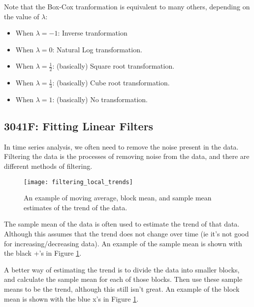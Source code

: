         Note that the Box-Cox tranformation is equivalent to many others, depending on the value of $\lambda$:
        \begin{itemize}
            \item When $\lambda = -1$: Inverse tranformation
            \item When $\lambda = 0$: Natural Log transformation.
            \item When $\lambda = \frac{1}{2}$: (basically) Square root transformation.
            \item When $\lambda = \frac{1}{3}$: (basically) Cube root transformation.
            \item When $\lambda = 1$: (basically) No transformation.
        \end{itemize}



        \subsection{3041F: Fitting Linear Filters}
        In time series analysis, we often need to remove the noise present in the data.
        Filtering the data is the processes of removing noise from the data, and there are different methods of filtering.
        \begin{figure}[t]
            \centering
            \texttt{[image: filtering\_local\_trends]}
            \caption{An example of moving average, block mean, and sample mean estimates of
            the trend of the data.}
            \label{fig:filtering_local_trends}
        \end{figure}

        The sample mean of the data is often used to estimate the trend of that data. Although this assumes that the trend does not change over time (ie it's not good for increasing/decreasing data).
        An example of the sample mean is shown with the black +'s in Figure \ref{fig:filtering_local_trends}.

        A better way of estimating the trend is to divide the data into smaller blocks, and calculate the sample mean for each of those blocks. Then use these sample means to be the trend, although this still isn't great.
        An example of the block mean is shown with the blue x's in Figure \ref{fig:filtering_local_trends}.

